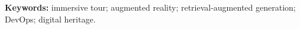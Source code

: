 \vspace{0.5cm}
\noindent\textbf{Keywords:} immersive tour; augmented reality;
retrieval-augmented generation; DevOps; digital heritage.

\endgroup

\cleardoublepage
{}
\listoftables
\vspace{-\baselineskip}

\cleardoublepage
{}
\listoffigures
\vspace{-\baselineskip}

\cleardoublepage
{}
\begingroup
\renewcommand{\contentsname}{SOMMAIRE}
\tableofcontents
\endgroup
